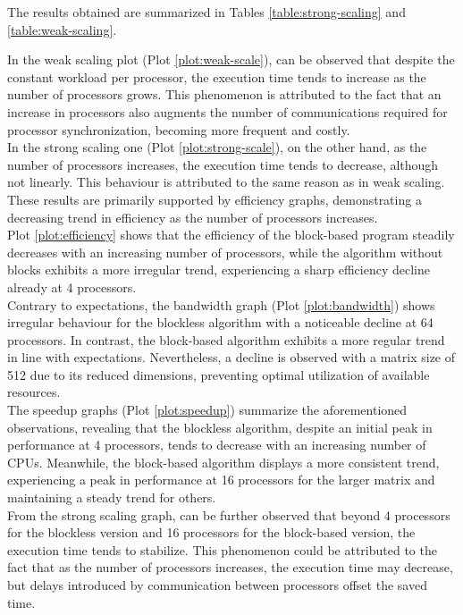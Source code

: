 The results obtained are summarized in Tables \ref{table:strong-scaling} and \ref{table:weak-scaling}. %




In the weak scaling plot (Plot \ref{plot:weak-scale}), can be observed that despite the constant workload per processor, the execution time tends to increase as the number of processors grows. %
This phenomenon is attributed to the fact that an increase in processors also augments the number of communications required for processor synchronization, %
becoming more frequent and costly.\\
In the strong scaling one (Plot \ref{plot:strong-scale}), on the other hand, as the number of processors increases, the execution time tends to decrease, although not linearly. %
This behaviour is attributed to the same reason as in weak scaling. These results are primarily supported by efficiency graphs, demonstrating a decreasing %
trend in efficiency as the number of processors increases.\\
Plot \ref{plot:efficiency} shows that the efficiency of the block-based program steadily decreases with an increasing number of processors, while the algorithm without blocks %
exhibits a more irregular trend, experiencing a sharp efficiency decline already at 4 processors.\\
Contrary to expectations, the bandwidth graph (Plot \ref{plot:bandwidth}) shows irregular behaviour for the blockless algorithm with a noticeable decline at 64 processors. In contrast, %
the block-based algorithm exhibits a more regular trend in line with expectations. Nevertheless, a decline is observed with a matrix size of 512 due to its %
reduced dimensions, preventing optimal utilization of available resources.\\
The speedup graphs (Plot \ref{plot:speedup}) summarize the aforementioned observations, revealing that the blockless algorithm, despite an initial peak in performance at 4 processors, %
tends to decrease with an increasing number of CPUs. Meanwhile, the block-based algorithm displays a more consistent trend, experiencing a peak in %
performance at 16 processors for the larger matrix and maintaining a steady trend for others.\\
From the strong scaling graph, can be further observed that beyond 4 processors for the blockless version and 16 processors for the block-based version, the %
execution time tends to stabilize. This phenomenon could be attributed to the fact that as the number of processors increases, the execution time may %
decrease, but delays introduced by communication between processors offset the saved time.

